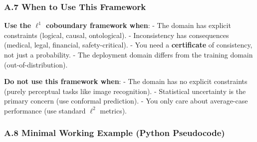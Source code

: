 \documentclass[
]{article}
\begin{document}
\subsubsection{A.7 When to Use This
Framework}\label{a.7-when-to-use-this-framework}

\textbf{Use the \(\ell^1\) coboundary framework when}: - The domain has
explicit constraints (logical, causal, ontological). - Inconsistency has
consequences (medical, legal, financial, safety-critical). - You need a
\textbf{certificate} of consistency, not just a probability. - The
deployment domain differs from the training domain
(out-of-distribution).

\textbf{Do not use this framework when}: - The domain has no explicit
constraints (purely perceptual tasks like image recognition). -
Statistical uncertainty is the primary concern (use conformal
prediction). - You only care about average-case performance (use
standard \(\ell^2\) metrics).

\subsubsection{A.8 Minimal Working Example (Python
Pseudocode)}\label{a.8-minimal-working-example-python-pseudocode}
\end{document}
